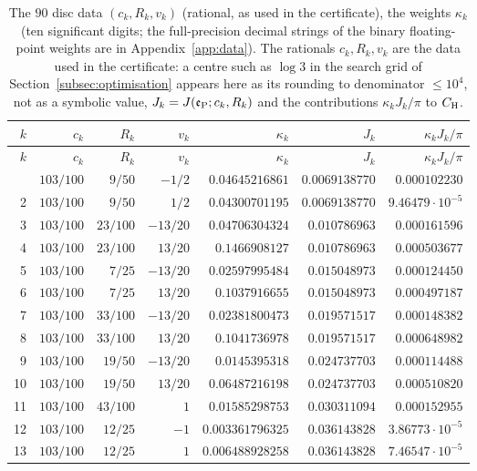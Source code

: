 \documentclass[11pt,reqno]{amsart}
\numberwithin{equation}{section}
\theoremstyle{definition}
\theoremstyle{remark}
\begin{document}
\small
\begin{center}
\begin{longtable}{@{}rrrrrrr@{}}\caption{The $90$ disc data $(c_k,R_k,v_k)$ (rational, as used in the certificate), the weights $\kappa_k$ (ten significant digits; the full-precision decimal strings of the binary floating-point weights are in Appendix~\ref{app:data}). The rationals $c_k,R_k,v_k$ are the data used in the certificate: a centre such as $\log3$ in the search grid of Section~\ref{subsec:optimisation} appears here as its rounding to denominator $\le10^4$, not as a symbolic value, $J_k=J(\mathfrak e_{\rm P};c_k,R_k)$ and the contributions $\kappa_kJ_k/\pi$ to $C_{\rm H}$.}\label{tab:hybrid_discs}\\
\toprule $k$ & $c_k$ & $R_k$ & $v_k$ & $\kappa_k$ & $J_k$ & $\kappa_kJ_k/\pi$\\\midrule\endfirsthead
\toprule $k$ & $c_k$ & $R_k$ & $v_k$ & $\kappa_k$ & $J_k$ & $\kappa_kJ_k/\pi$\\\midrule\endhead
\bottomrule\endfoot
1 & $103/100$ & $9/50$ & $-1/2$ & $0.04645216861$ & $0.0069138770$ & $0.000102230$\\
2 & $103/100$ & $9/50$ & $1/2$ & $0.04300701195$ & $0.0069138770$ & $9.46479\cdot10^{-5}$\\
3 & $103/100$ & $23/100$ & $-13/20$ & $0.04706304324$ & $0.010786963$ & $0.000161596$\\
4 & $103/100$ & $23/100$ & $13/20$ & $0.1466908127$ & $0.010786963$ & $0.000503677$\\
5 & $103/100$ & $7/25$ & $-13/20$ & $0.02597995484$ & $0.015048973$ & $0.000124450$\\
6 & $103/100$ & $7/25$ & $13/20$ & $0.1037916655$ & $0.015048973$ & $0.000497187$\\
7 & $103/100$ & $33/100$ & $-13/20$ & $0.02381800473$ & $0.019571517$ & $0.000148382$\\
8 & $103/100$ & $33/100$ & $13/20$ & $0.1041736978$ & $0.019571517$ & $0.000648982$\\
9 & $103/100$ & $19/50$ & $-13/20$ & $0.0145395318$ & $0.024737703$ & $0.000114488$\\
10 & $103/100$ & $19/50$ & $13/20$ & $0.06487216198$ & $0.024737703$ & $0.000510820$\\
11 & $103/100$ & $43/100$ & $1$ & $0.01585298753$ & $0.030311094$ & $0.000152955$\\
12 & $103/100$ & $12/25$ & $-1$ & $0.003361796325$ & $0.036143828$ & $3.86773\cdot10^{-5}$\\
13 & $103/100$ & $12/25$ & $1$ & $0.006488928258$ & $0.036143828$ & $7.46547\cdot10^{-5}$\\

\end{longtable}
\end{center}
\end{document}
